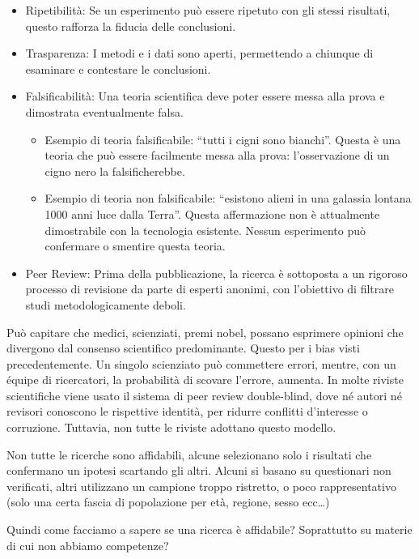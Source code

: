 \documentclass[12pt]{book} %
\begin{document}
\begin{itemize}
\item Ripetibilità: Se un esperimento può essere ripetuto con gli stessi risultati, questo rafforza la fiducia delle conclusioni.
\item Trasparenza: I metodi e i dati sono aperti, permettendo a chiunque di esaminare e contestare le conclusioni.
\item Falsificabilità: Una teoria scientifica deve poter essere messa alla prova e dimostrata eventualmente falsa.
\begin{itemize}
\item Esempio di teoria falsificabile: “tutti i cigni sono bianchi”. Questa è una teoria che può essere facilmente messa alla prova: l'osservazione di un cigno nero la falsificherebbe.
\item Esempio di teoria non falsificabile: “esistono alieni in una galassia lontana 1000 anni luce dalla Terra”. Questa affermazione non è attualmente dimostrabile con la tecnologia esistente. Nessun esperimento può confermare o smentire questa teoria.
\end{itemize}
\item Peer Review: Prima della pubblicazione, la ricerca è sottoposta a un rigoroso processo di revisione da parte di esperti anonimi, con l’obiettivo di filtrare studi metodologicamente deboli.
\end{itemize}

Può capitare che medici, scienziati, premi nobel, possano esprimere opinioni che divergono dal consenso scientifico predominante. Questo per i bias visti precedentemente. Un singolo scienziato può commettere errori, mentre, con un équipe di ricercatori, la probabilità di scovare l'errore, aumenta. In molte riviste scientifiche viene usato il sistema di peer review double-blind, dove né autori né revisori conoscono le rispettive identità, per ridurre conflitti d’interesse o corruzione. Tuttavia, non tutte le riviste adottano questo modello.

Non tutte le ricerche sono affidabili, alcune selezionano solo i risultati che confermano un ipotesi scartando gli altri. Alcuni si basano su questionari non verificati, altri utilizzano un campione troppo ristretto, o poco rappresentativo (solo una certa fascia di popolazione per età, regione, sesso ecc…)

Quindi come facciamo a sapere se una ricerca è affidabile? Soprattutto su materie di cui non abbiamo competenze?
\end{document}
